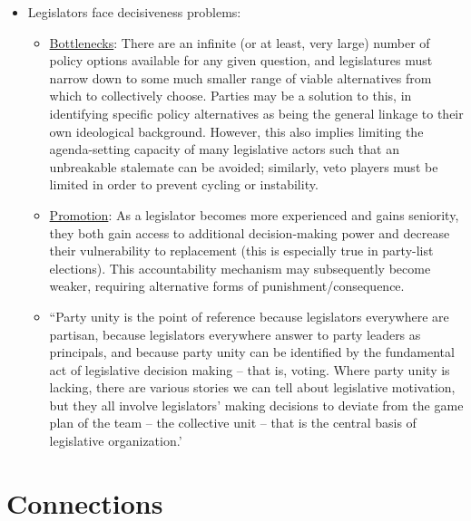 \documentclass[12pt]{article}
\begin{document}
\begin{itemize}[leftmargin=*, itemsep=4pt]
    \item Legislators face decisiveness problems:
    \begin{itemize}
        \item \underline{Bottlenecks}: There are an infinite (or at least, very large) number of policy options available for any given question, and legislatures must narrow down to some much smaller range of viable alternatives from which to collectively choose. Parties may be a solution to this, in identifying specific policy alternatives as being the general linkage to their own ideological background. However, this also implies limiting the agenda-setting capacity of many legislative actors such that an unbreakable stalemate can be avoided; similarly, veto players must be limited in order to prevent cycling or instability.
        \item \underline{Promotion}: As a legislator becomes more experienced and gains seniority, they both gain access to additional decision-making power and decrease their vulnerability to replacement (this is especially true in party-list elections). This accountability mechanism may subsequently become weaker, requiring alternative forms of punishment/consequence.
        \item ``Party unity is the point of reference because legislators everywhere are partisan, because legislators everywhere answer to party leaders as principals, and because party unity can be identified by the fundamental act of legislative decision making -- that is, voting. Where party unity is lacking, there are various stories we can tell about legislative motivation, but they all involve legislators' making decisions to deviate from the game plan of the team -- the collective unit -- that is the central basis of legislative organization.'
    \end{itemize}
\end{itemize}


\section{Connections}
\end{document}
